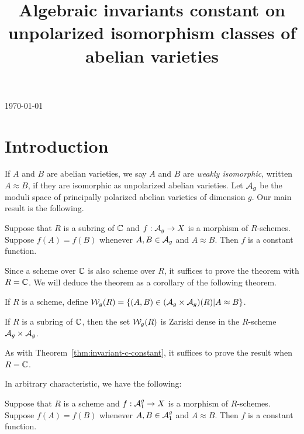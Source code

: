 \documentclass{amsart}
\title[Invariants constant on unpolarized isomorphism classes]{Algebraic invariants constant on unpolarized isomorphism classes of abelian varieties}
\begin{document}
\today
\tableofcontents
\maketitle

\section{Introduction}
\label{sec:introduction}

If $A$ and $B$ are abelian varieties, we say $A$ and $B$ are \emph{weakly isomorphic}, written $A \approx B$, if they are isomorphic as unpolarized abelian varieties. Let $\mathcal{A}_g$ be the moduli space of principally polarized abelian varieties of dimension $g$. Our main result is the following.
\begin{theorem}\label{thm:invariant-c-constant}
  Suppose that $R$ is a subring of $\mathbb{C}$ and $f: \mathcal{A}_g \to X$ is a morphism of $R$-schemes. Suppose $f(A) = f(B)$ whenever $A,B \in \mathcal{A}_g$ and $A \approx B$. Then $f$ is a constant function.
\end{theorem}
Since a scheme over $\mathbb{C}$ is also scheme over $R$, it suffices to prove the theorem with $R = \mathbb{C}$. We will deduce the theorem as a corollary of the following theorem.

If $R$ is a scheme, define $\mathcal{W}_g(R) = \{(A,B) \in (\mathcal{A}_g \times \mathcal{A}_g)(R) | A \approx B\}$.
\begin{theorem}\label{thm:sg-c-dense}
  If $R$ is a subring of $\mathbb{C}$, then the set $\mathcal{W}_g(R)$ is Zariski dense in the $R$-scheme $\mathcal{A}_g \times \mathcal{A}_g$.
\end{theorem}
As with Theorem~\ref{thm:invariant-c-constant}, it suffices to prove the result when $R = \mathbb{C}$.

In arbitrary characteristic, we have the following:
\begin{theorem}
  Suppose that $R$ is a scheme and $f: \mathcal{A}_1^g \to X$ is a morphism of $R$-schemes. Suppose $f(A) = f(B)$ whenever $A,B \in \mathcal{A}_1^g$ and $A \approx B$. Then $f$ is a constant function.
\end{theorem}
\end{document}
